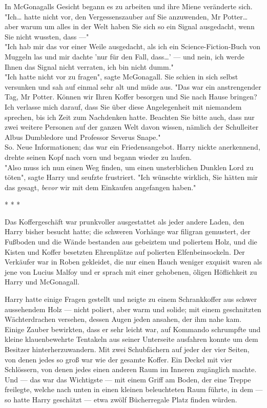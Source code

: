 {In McGonagalls Gesicht begann es zu arbeiten und ihre Miene veränderte sich. "Ich… hatte nicht vor, den Vergessenszauber auf Sie anzuwenden, Mr Potter… aber warum um alles in der Welt haben Sie sich so ein Signal ausgedacht, wenn Sie nicht wussten, dass ---"\\ "Ich hab mir das vor einer Weile ausgedacht, als ich ein Science-Fiction-Buch von Muggeln las und mir dachte 'nur für den Fall, dass…' --- und nein, ich werde Ihnen das Signal nicht verraten, ich bin nicht dumm."\\ "Ich hatte nicht vor zu fragen", sagte McGonagall. Sie schien in sich selbst versunken und sah auf einmal sehr alt und müde aus. "Das war ein anstrengender Tag, Mr Potter. Können wir Ihren Koffer besorgen und Sie nach Hause bringen? Ich verlasse mich darauf, dass Sie über diese Angelegenheit mit niemandem sprechen, bis ich Zeit zum Nachdenken hatte. Beachten Sie bitte auch, dass nur zwei weitere Personen auf der ganzen Welt davon wissen, nämlich der Schulleiter Albus Dumbledore und Professor Severus Snape."\\ So. Neue Informationen; das war ein Friedensangebot. Harry nickte anerkennend, drehte seinen Kopf nach vorn und begann wieder zu laufen.\\ "Also muss ich nun einen Weg finden, um einen unsterblichen Dunklen Lord zu töten", sagte Harry und seufzte frustriert. "Ich wünschte wirklich, Sie hätten mir das gesagt, \emph{bevor} wir mit dem Einkaufen angefangen haben."

* * *

Das Koffergeschäft war prunkvoller ausgestattet als jeder andere Laden, den Harry bisher besucht hatte; die schweren Vorhänge war filigran gemustert, der Fußboden und die Wände bestanden aus gebeiztem und poliertem Holz, und die Kisten und Koffer besetzten Ehrenplätze auf polierten Elfenbeinsockeln. Der Verkäufer war in Roben gekleidet, die nur einen Hauch weniger exquisit waren als jene von Lucius Malfoy und er sprach mit einer gehobenen, öligen Höflichkeit zu Harry und McGonagall.

Harry hatte einige Fragen gestellt und neigte zu einem Schrankkoffer aus schwer aussehendem Holz --- nicht poliert, aber warm und solide; mit einem geschnitzten Wächterdrachen versehen, dessen Augen jeden ansahen, der ihm nahe kam. Einige Zauber bewirkten, dass er sehr leicht war, auf Kommando schrumpfte und kleine klauenbewehrte Tentakeln aus seiner Unterseite ausfahren konnte um dem Besitzer hinterherzuwandern. Mit zwei Schubfächern auf jeder der vier Seiten, von denen jedes so groß war wie der gesamte Koffer. Ein Deckel mit vier Schlössern, von denen jedes einen anderen Raum im Inneren zugänglich machte. Und --- das war das Wichtigste --- mit einem Griff am Boden, der eine Treppe freilegte, welche nach unten in einen kleinen beleuchteten Raum führte, in dem --- so hatte Harry geschätzt --- etwa zwölf Bücherregale Platz finden würden.

}

